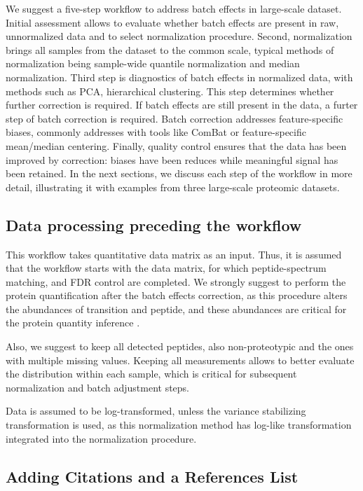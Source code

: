 \documentclass[alpha-refs]{wiley-article}
\begin{document}
We suggest a five-step workflow to address batch effects in large-scale dataset. Initial assessment allows to evaluate whether batch effects are present in raw, unnormalized data and to select normalization procedure. Second, normalization brings all samples from the dataset to the common scale, typical methods of normalization being sample-wide quantile normalization and median normalization. Third step is diagnostics of batch effects in normalized data, with methods such as PCA, hierarchical clustering. This step determines whether further correction is required. If batch effects are still present in the data, a furter step of batch correction is required. Batch correction addresses feature-specific biases, commonly addresses with tools like ComBat \cite{Johnson:2007aa} or feature-specific mean/median centering. Finally, quality control ensures that the data has been improved by correction: biases have been reduces while meaningful signal has been retained. In the next sections, we discuss each step of the workflow in more detail, illustrating it with examples from three large-scale proteomic datasets.

\subsection{Data processing preceding the workflow} 
This workflow takes quantitative data matrix as an input. Thus, it is assumed that the workflow starts with the data matrix, for which peptide-spectrum matching, and FDR control are completed. We strongly suggest to perform the protein quantification after the batch effects correction, as this procedure alters the abundances of transition and peptide, and these abundances are critical for the protein quantity inference \cite{Clough:2012aa, Teo:2015aa}.  

Also, we suggest to keep all detected peptides, also non-proteotypic and the ones with multiple missing values. Keeping all measurements allows to better evaluate the distribution within each sample, which is critical for subsequent normalization and batch adjustment steps.

Data is assumed to be log-transformed, unless the variance stabilizing transformation \cite{Durbin2002} is used, as this normalization method has log-like transformation integrated into the normalization procedure.

\subsection{Adding Citations and a References List}
\end{document}
